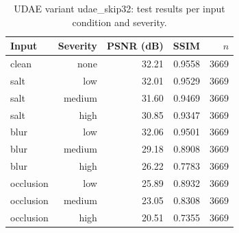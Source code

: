 \begin{table}[t]
\centering
\caption{UDAE variant udae_skip32: test results per input condition and severity.}
\label{tab:task1_by_type_level}
\begin{tabular}{lrrrr}
\toprule
Input & Severity & PSNR (dB) & SSIM & $n$ \\
\midrule
clean & none & 32.21 & 0.9558 & 3669 \\
salt & low & 32.01 & 0.9529 & 3669 \\
salt & medium & 31.60 & 0.9469 & 3669 \\
salt & high & 30.85 & 0.9347 & 3669 \\
blur & low & 32.06 & 0.9501 & 3669 \\
blur & medium & 29.18 & 0.8908 & 3669 \\
blur & high & 26.22 & 0.7783 & 3669 \\
occlusion & low & 25.89 & 0.8932 & 3669 \\
occlusion & medium & 23.05 & 0.8308 & 3669 \\
occlusion & high & 20.51 & 0.7355 & 3669 \\
\bottomrule
\end{tabular}
\end{table}
